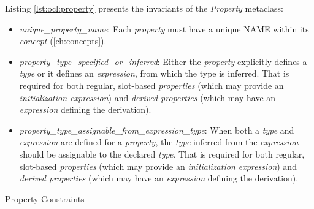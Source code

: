 Listing \ref{lst:ocl:property} presents the invariants
of the \emph{Property} metaclass:

\begin{itemize}

\item \emph{unique\_property\_name}:
Each \emph{property} must have a unique NAME within its \emph{concept}
(\ref{ch:concepts}).

\item \emph{property\_type\_specified\_or\_inferred}:
Either the \emph{property} explicitly defines a \emph{type}
or it defines an \emph{expression},
from which the type is inferred.
That is required for both regular, slot-based \emph{properties}
(which may provide an \emph{initialization expression})
and \emph{derived properties}
(which may have an \emph{expression} defining the derivation).

\item \emph{property\_type\_assignable\_from\_expression\_type}:
When both a \emph{type} and \emph{expression} are defined for a \emph{property},
the \emph{type} inferred from the \emph{expression} should be assignable to
the declared \emph{type}.
That is required for both regular, slot-based \emph{properties}
(which may provide an \emph{initialization expression})
and \emph{derived properties}
(which may have an \emph{expression} defining the derivation).

\end{itemize}

\begin{code}

\caption{Property Constraints}
\label{lst:ocl:property}
\end{code}
